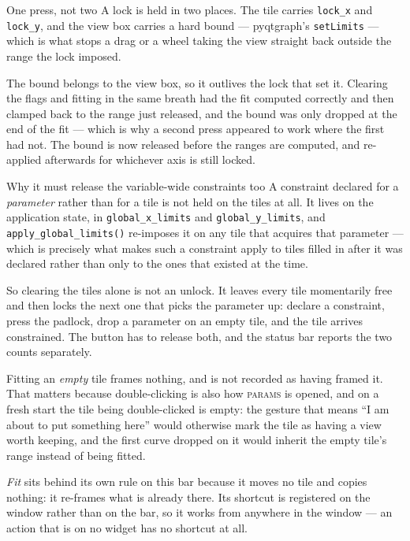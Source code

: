 \documentclass[11pt,a4paper,oneside]{report}
\newcommand{\code}[1]{\texttt{#1}}
\newcommand{\tab}[1]{\textsc{#1}}
\begin{document}
\begin{aoenote}{One press, not two}
A lock is held in two places. The tile carries \code{lock\_x} and
\code{lock\_y}, and the view box carries a hard bound --- pyqtgraph's
\code{setLimits} --- which is what stops a drag or a wheel taking the view
straight back outside the range the lock imposed.

The bound belongs to the view box, so it outlives the lock that set it.
Clearing the flags and fitting in the same breath had the fit computed
correctly and then clamped back to the range just released, and the bound was
only dropped at the end of the fit --- which is why a second press appeared to
work where the first had not. The bound is now released before the ranges are
computed, and re-applied afterwards for whichever axis is still locked.
\end{aoenote}

\begin{aoenote}{Why it must release the variable-wide constraints too}
A constraint declared for a \emph{parameter} rather than for a tile is not held
on the tiles at all. It lives on the application state, in
\code{global\_x\_limits} and \code{global\_y\_limits}, and
\code{apply\_global\_limits()} re-imposes it on any tile that acquires that
parameter --- which is precisely what makes such a constraint apply to tiles
filled in after it was declared rather than only to the ones that existed at the
time.

So clearing the tiles alone is not an unlock. It leaves every tile momentarily
free and then locks the next one that picks the parameter up: declare a
constraint, press the padlock, drop a parameter on an empty tile, and the tile
arrives constrained. The button has to release both, and the status bar reports
the two counts separately.
\end{aoenote}

Fitting an \emph{empty} tile frames nothing, and is not recorded as having
framed it. That matters because double-clicking is also how \tab{params} is
opened, and on a fresh start the tile being double-clicked is empty: the
gesture that means ``I am about to put something here'' would otherwise mark
the tile as having a view worth keeping, and the first curve dropped on it
would inherit the empty tile's range instead of being fitted.

\emph{Fit} sits behind its own rule on this bar because it moves no tile and
copies nothing: it re-frames what is already there. Its shortcut is registered
on the window rather than on the bar, so it works from anywhere in the window
--- an action that is on no widget has no shortcut at all.
\end{document}
